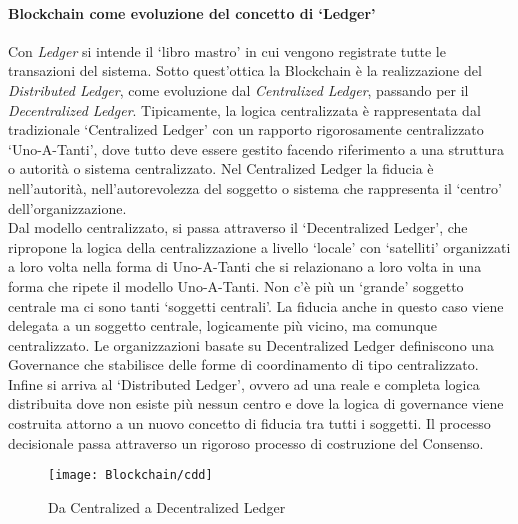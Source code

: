 \paragraph{Blockchain come evoluzione del concetto di \enquote*{Ledger}} 
Con \emph{Ledger} si intende il \enquote*{libro mastro} in cui vengono registrate tutte le transazioni del sistema. Sotto quest'ottica la Blockchain è la realizzazione del \emph{Distributed Ledger}, come evoluzione dal \emph{Centralized Ledger}, passando per il \emph{Decentralized Ledger}. Tipicamente, la logica centralizzata è rappresentata dal tradizionale \enquote*{Centralized Ledger} con un rapporto rigorosamente centralizzato \enquote*{Uno-A-Tanti}, dove tutto deve essere gestito facendo riferimento a una struttura o autorità o sistema centralizzato. Nel Centralized Ledger la fiducia è nell’autorità, nell’autorevolezza del soggetto o sistema che rappresenta il \enquote*{centro} dell’organizzazione. \\
Dal modello centralizzato, si passa attraverso il \enquote*{Decentralized Ledger}, che ripropone la logica della centralizzazione a livello \enquote*{locale} con \enquote*{satelliti} organizzati a loro volta nella forma di Uno-A-Tanti che si relazionano a loro volta in una forma che ripete il modello Uno-A-Tanti. Non c’è più un \enquote*{grande} soggetto centrale ma ci sono tanti \enquote*{soggetti centrali}. La fiducia anche in questo caso viene delegata a un soggetto centrale, logicamente più vicino, ma comunque centralizzato. Le organizzazioni basate su Decentralized Ledger definiscono una Governance che stabilisce delle forme di coordinamento di tipo centralizzato. \\
Infine si arriva al \enquote*{Distributed Ledger}, ovvero ad una reale e completa logica distribuita dove non esiste più nessun centro e dove la logica di governance viene costruita attorno a un nuovo concetto di fiducia tra tutti i soggetti. Il processo decisionale passa attraverso un rigoroso processo di costruzione del Consenso.
%
\begin{center}%
	\begin{figure}[H]
		\centering
		\texttt{[image: Blockchain/cdd]}
		\caption{Da Centralized a Decentralized Ledger}
		\label{fig:da centralized a decentralized ledger}
	\end{figure}%
\end{center}
%
